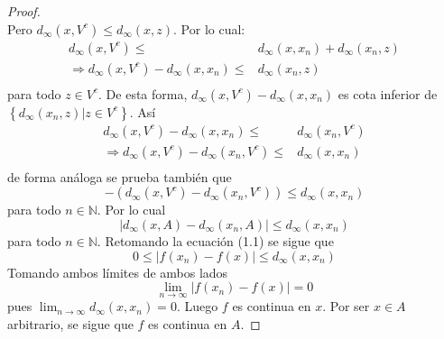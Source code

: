 \documentclass[12pt]{report}
\theoremstyle{largebreak}
\newcommand\abs[1]{\ensuremath{\lvert#1\rvert}}
\begin{document}
\begin{proof}
\begin{equation*}
    \end{equation*}
    Pero $d_{\infty}(x,V^c)\leq d_{\infty}(x,z)$. Por lo cual:
    \begin{equation*}
        \begin{split}
            d_{\infty}(x,V^c)\leq&d_{\infty}(x,x_n)+d_{\infty}(x_n,z)\\
            \Rightarrow d_{\infty}(x,V^c)-d_{\infty}(x,x_n)\leq&d_{\infty}(x_n,z)\\
        \end{split}
    \end{equation*}
    para todo $z\in V^c$. De esta forma, $d_{\infty}(x,V^c)-d_{\infty}(x,x_n)$ es cota inferior de $\left\{d_{\infty}(x_n,z)|z\in V^c\right\}$. Así
    \begin{equation*}
        \begin{split}
            d_{\infty}(x,V^c)-d_{\infty}(x,x_n)\leq&d_{\infty}(x_n,V^c)\\
            \Rightarrow d_{\infty}(x,V^c)-d_{\infty}(x_n,V^c)\leq&d_{\infty}(x,x_n)\\
        \end{split}
    \end{equation*}
    de forma análoga se prueba también que
    \begin{equation*}
        -\left(d_{\infty}(x,V^c)-d_{\infty}(x_n,V^c)\right)\leq d_{\infty}(x,x_n)
    \end{equation*}
    para todo $n\in\mathbb{N}$. Por lo cual
    \begin{equation*}
        \abs{d_{\infty}(x,A)-d_{\infty}(x_n,A)}\leq d_{\infty}(x, x_n)
    \end{equation*}
    para todo $n\in\mathbb{N}$. Retomando la ecuación (1.1) se sigue que
    \begin{equation*}
        0\leq\abs{f(x_n)-f(x)}\leq d_{\infty}(x,x_n)
    \end{equation*}
    Tomando ambos límites de ambos lados
    \begin{equation*}
        \lim_{n\rightarrow\infty}\abs{f(x_n)-f(x)}=0
    \end{equation*}
    pues $\lim_{n\rightarrow\infty}d_{\infty}(x,x_n)=0$. Luego $f$ es continua en $x$. Por ser $x\in A$ arbitrario, se sigue que $f$ es continua en $A$.


\end{proof}
\end{document}
